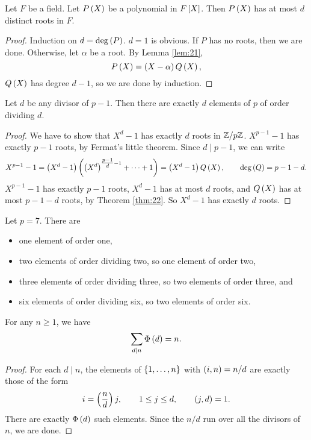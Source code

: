 \begin{theorem}
\label{thm:22}
Let $ F $ be a field. Let $ P\rb{X} $ be a polynomial in $ F\sb{X} $. Then $ P\rb{X} $ has at most $ d $ distinct roots in $ F $.
\end{theorem}

\begin{proof}
Induction on $ d = \deg\rb{P} $. $ d = 1 $ is obvious. If $ P $ has no roots, then we are done. Otherwise, let $ \alpha $ be a root. By Lemma \ref{lem:21},
$$ P\rb{X} = \rb{X - \alpha}Q\rb{X}, $$
$ Q\rb{X} $ has degree $ d - 1 $, so we are done by induction.
\end{proof}

\begin{corollary}
\label{cor:23}
Let $ d $ be any divisor of $ p - 1 $. Then there are exactly $ d $ elements of $ \unit{p} $ of order dividing $ d $.
\end{corollary}

\begin{proof}
We have to show that $ X^d - 1 $ has exactly $ d $ roots in $ \Z / p\Z $. $ X^{p - 1} - 1 $ has exactly $ p - 1 $ roots, by Fermat's little theorem. Since $ d \mid p - 1 $, we can write
$$ X^{p - 1} - 1 = \rb{X^d - 1}\rb{\rb{X^d}^{\tfrac{p - 1}{d} - 1} + \dots + 1} = \rb{X^d - 1}Q\rb{X}, \qquad \deg\rb{Q} = p - 1 - d. $$
$ X^{p - 1} - 1 $ has exactly $ p - 1 $ roots, $ X^d - 1 $ has at most $ d $ roots, and $ Q\rb{X} $ has at most $ p - 1 - d $ roots, by Theorem \ref{thm:22}. So $ X^d - 1 $ has exactly $ d $ roots.
\end{proof}

\begin{example*}
Let $ p = 7 $. There are
\begin{itemize}
\item one element of order one,
\item two elements of order dividing two, so one element of order two,
\item three elements of order dividing three, so two elements of order three, and
\item six elements of order dividing six, so two elements of order six.
\end{itemize}
\end{example*}

\begin{lemma}
\label{lem:24}
For any $ n \ge 1 $, we have
$$ \sum_{d \mid n} \Phi\rb{d} = n. $$
\end{lemma}

\begin{proof}
For each $ d \mid n $, the elements of $ \cb{1, \dots, n} $ with $ \rb{i, n} = n / d $ are exactly those of the form
$$ i = \rb{\dfrac{n}{d}}j, \qquad 1 \le j \le d, \qquad \rb{j, d} = 1. $$
There are exactly $ \Phi\rb{d} $ such elements. Since the $ n / d $ run over all the divisors of $ n $, we are done.
\end{proof}

